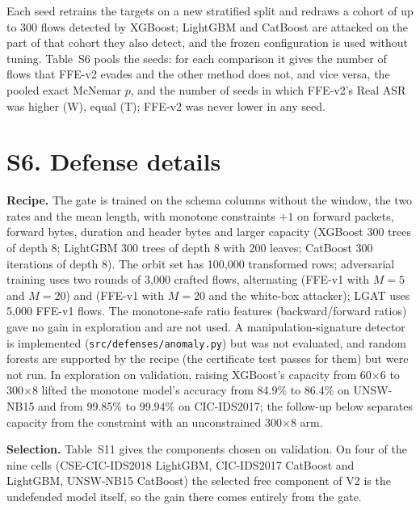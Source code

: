 Each seed retrains the targets on a new stratified split and redraws a cohort of up to 300 flows detected by XGBoost; LightGBM and CatBoost are attacked on the part of that cohort they also detect, and the frozen configuration is used without tuning. Table~S6 pools the seeds: for each comparison it gives the number of flows that FFE-v2 evades and the other method does not, and vice versa, the pooled exact McNemar $p$, and the number of seeds in which FFE-v2's Real ASR was higher (W), equal (T); FFE-v2 was never lower in any seed.

\begin{table}[!htbp]
\centering
\caption*{Table S6. Pooled paired comparison of FFE-v2 with FFE-v1, the control and CAPGD over seeds.}
\scriptsize
\resizebox{\textwidth}{!}{%
%
}
\end{table}

\section*{S6. Defense details}

\textbf{Recipe.} The gate is trained on the schema columns without the window, the two rates and the mean length, with monotone constraints $+1$ on forward packets, forward bytes, duration and header bytes and larger capacity (XGBoost 300 trees of depth 8; LightGBM 300 trees of depth 8 with 200 leaves; CatBoost 300 iterations of depth 8). The orbit set has 100,000 transformed rows; adversarial training uses two rounds of 3,000 crafted flows, alternating (FFE-v1 with $M=5$ and $M=20$) and (FFE-v1 with $M=20$ and the white-box attacker); LGAT uses 5,000 FFE-v1 flows. The monotone-safe ratio features (backward/forward ratios) gave no gain in exploration and are not used. A manipulation-signature detector is implemented (\texttt{src/defenses/anomaly.py}) but was not evaluated, and random forests are supported by the recipe (the certificate test passes for them) but were not run. In exploration on validation, raising XGBoost's capacity from 60$\times$6 to 300$\times$8 lifted the monotone model's accuracy from 84.9\% to 86.4\% on UNSW-NB15 and from 99.85\% to 99.94\% on CIC-IDS2017; the follow-up below separates capacity from the constraint with an unconstrained 300$\times$8 arm.

\textbf{Selection.} Table~S11 gives the components chosen on validation. On four of the nine cells (CSE-CIC-IDS2018 LightGBM, CIC-IDS2017 CatBoost and LightGBM, UNSW-NB15 CatBoost) the selected free component of V2 is the undefended model itself, so the gain there comes entirely from the gate.

